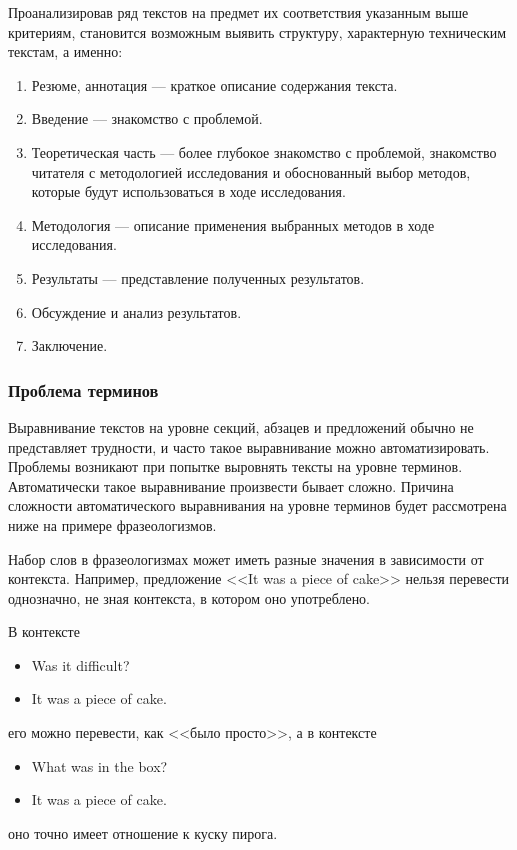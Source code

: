 Проанализировав ряд текстов на предмет их соответствия указанным выше критериям, становится возможным выявить структуру, характерную техническим текстам, а именно:
\begin{enumerate}
    \item Резюме, аннотация --- краткое описание содержания текста.
    \item Введение --- знакомство с проблемой.
    \item Теоретическая часть --- более глубокое знакомство с проблемой, знакомство читателя с методологией исследования и обоснованный выбор методов, которые будут использоваться в ходе исследования.
    \item Методология --- описание применения выбранных методов в ходе исследования.
    \item Результаты --- представление полученных результатов.
    \item Обсуждение и анализ результатов.
    \item Заключение.
\end{enumerate}






\subsubsection{Проблема терминов}

Выравнивание текстов на уровне секций, абзацев и предложений обычно не представляет трудности, и часто такое выравнивание можно автоматизировать.
Проблемы возникают при попытке выровнять тексты на уровне терминов.
Автоматически такое выравнивание произвести бывает сложно.
Причина сложности автоматического выравнивания на уровне терминов будет рассмотрена ниже на примере фразеологизмов.

Набор слов в фразеологизмах может иметь разные значения в зависимости от контекста.
Например, предложение <<It was a piece of cake>> нельзя перевести однозначно, не зная контекста, в котором оно употреблено.

В контексте 
\begin{itemize}
    \item Was it difficult?
    \item It was a piece of cake.
\end{itemize}
его можно перевести, как <<было просто>>, а в контексте
\begin{itemize}
    \item What was in the box?
    \item It was a piece of cake.
\end{itemize}
оно точно имеет отношение к куску пирога.


